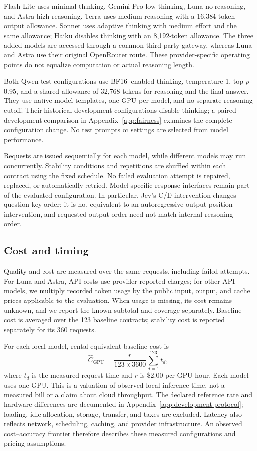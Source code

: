 \documentclass{article}
\begin{document}
Flash-Lite uses minimal thinking, Gemini Pro low thinking, Luna no reasoning, and Astra high reasoning. Terra uses medium reasoning with a 16,384-token output allowance. Sonnet uses adaptive thinking with medium effort and the same allowance; Haiku disables thinking with an 8,192-token allowance. The three added models are accessed through a common third-party gateway, whereas Luna and Astra use their original OpenRouter route. These provider-specific operating points do not equalize computation or actual reasoning length.

Both Qwen test configurations use BF16, enabled thinking, temperature 1, top-$p$ 0.95, and a shared allowance of 32,768 tokens for reasoning and the final answer. They use native model templates, one GPU per model, and no separate reasoning cutoff. Their historical development configurations disable thinking; a paired development comparison in Appendix~\ref{app:fairness} examines the complete configuration change. No test prompts or settings are selected from model performance.

Requests are issued sequentially for each model, while different models may run concurrently. Stability conditions and repetitions are shuffled within each contract using the fixed schedule. No failed evaluation attempt is repaired, replaced, or automatically retried. Model-specific response interfaces remain part of the evaluated configuration. In particular, Jev's C/D intervention changes question-key order; it is not equivalent to an autoregressive output-position intervention, and requested output order need not match internal reasoning order.

\subsection{Cost and timing}
Quality and cost are measured over the same requests, including failed attempts. For Luna and Astra, API costs use provider-reported charges; for other API models, we multiply recorded token usage by the public input, output, and cache prices applicable to the evaluation. When usage is missing, its cost remains unknown, and we report the known subtotal and coverage separately. Baseline cost is averaged over the 123 baseline contracts; stability cost is reported separately for its 360 requests.

For each local model, rental-equivalent baseline cost is
\begin{equation}
\widehat C_{\mathrm{GPU}}=\frac{r}{123\times3600}\sum_{d=1}^{123}t_d,
\end{equation}
where $t_d$ is the measured request time and $r$ is \$2.00 per GPU-hour. Each model uses one GPU. This is a valuation of observed local inference time, not a measured bill or a claim about cloud throughput. The declared reference rate and hardware differences are documented in Appendix~\ref{app:development-protocol}; loading, idle allocation, storage, transfer, and taxes are excluded. Latency also reflects network, scheduling, caching, and provider infrastructure. An observed cost--accuracy frontier therefore describes these measured configurations and pricing assumptions.
\end{document}
